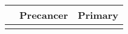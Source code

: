 \begin{tabular}{lcc}
\toprule
{} & Precancer & Primary \\
\midrule
{} &           &         \\
\bottomrule
\end{tabular}
